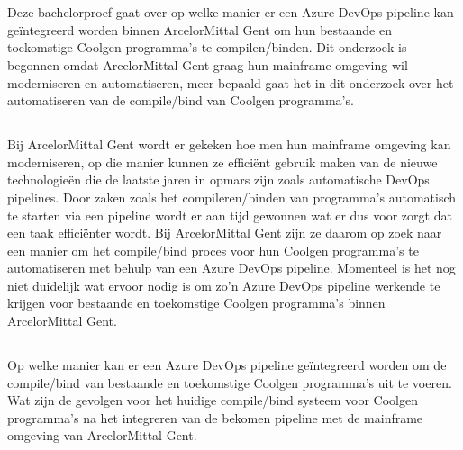 
\chapter{}%
\label{ch:inleiding}

Deze bachelorproef gaat over op welke manier er een Azure DevOps pipeline kan geïntegreerd worden binnen ArcelorMittal Gent om hun bestaande en toekomstige Coolgen programma's te compilen/binden. 
Dit onderzoek is begonnen omdat ArcelorMittal Gent graag hun mainframe omgeving wil moderniseren en automatiseren, meer bepaald gaat het in dit onderzoek over het automatiseren van de compile/bind van Coolgen programma's.



\section{}%
\label{sec:probleemstelling}

Bij ArcelorMittal Gent wordt er gekeken hoe men hun mainframe omgeving kan moderniseren, op die manier kunnen ze efficiënt gebruik maken van de nieuwe technologieën die de laatste jaren in opmars zijn zoals automatische DevOps pipelines. 
Door zaken zoals het compileren/binden van programma's automatisch te starten via een pipeline wordt er aan tijd gewonnen wat er dus voor zorgt dat een taak efficiënter wordt. 
Bij ArcelorMittal Gent zijn ze daarom op zoek naar een manier om het compile/bind proces voor hun Coolgen programma's te automatiseren met behulp van een Azure DevOps pipeline.
Momenteel is het nog niet duidelijk wat ervoor nodig is om zo'n Azure DevOps pipeline werkende te krijgen voor bestaande en toekomstige Coolgen programma's binnen ArcelorMittal Gent.

\section{}%
\label{sec:onderzoeksvraag}

Op welke manier kan er een Azure DevOps pipeline geïntegreerd worden om de compile/bind van bestaande en toekomstige Coolgen programma's uit te voeren. 
Wat zijn de gevolgen voor het huidige compile/bind systeem voor Coolgen programma's na het integreren van de bekomen pipeline met de mainframe omgeving van ArcelorMittal Gent. 

